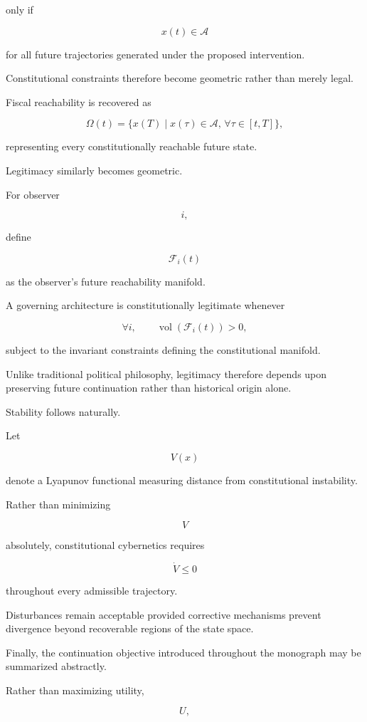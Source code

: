 \documentclass[12pt,a4paper]{article}
\begin{document}
only if

\[
x(t)
\in
\mathcal{A}
\]

for all future trajectories generated under the proposed intervention.

Constitutional constraints therefore become geometric rather than merely legal.

Fiscal reachability is recovered as

\[
\Omega(t)
=
\{
x(T)
\mid
x(\tau)
\in
\mathcal{A},
\,
\forall
\tau
\in
[t,T]
\},
\]

representing every constitutionally reachable future state.

Legitimacy similarly becomes geometric.

For observer

\[
i,
\]

define

\[
\mathcal{F}_i(t)
\]

as the observer's future reachability manifold.

A governing architecture is constitutionally legitimate whenever

\[
\forall i,
\qquad
\operatorname{vol}
\left(
\mathcal{F}_i(t)
\right)
>
0,
\]

subject to the invariant constraints defining the constitutional manifold.

Unlike traditional political philosophy, legitimacy therefore depends upon preserving future continuation rather than historical origin alone.

Stability follows naturally.

Let

\[
V(x)
\]

denote a Lyapunov functional measuring distance from constitutional instability.

Rather than minimizing

\[
V
\]

absolutely, constitutional cybernetics requires

\[
\dot{V}
\le
0
\]

throughout every admissible trajectory.

Disturbances remain acceptable provided corrective mechanisms prevent divergence beyond recoverable regions of the state space.

Finally, the continuation objective introduced throughout the monograph may be summarized abstractly.

Rather than maximizing utility,

\[
U,
\]
\end{document}
